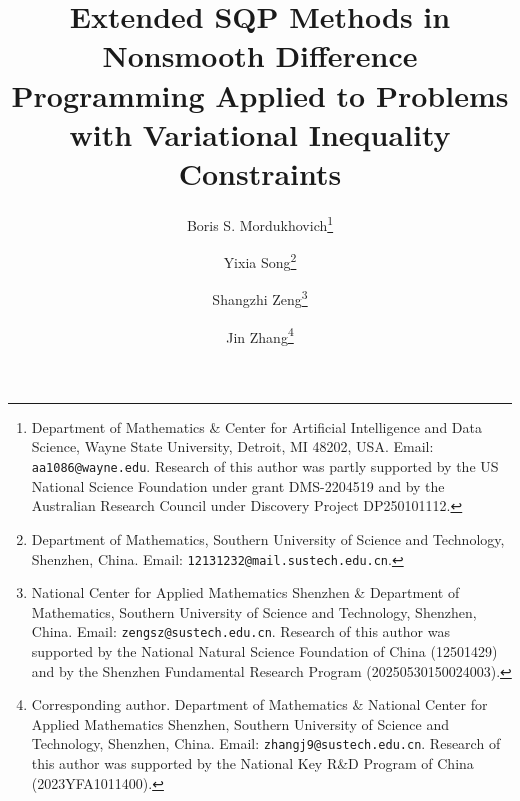 \documentclass[11pt,a4paper]{article}
\theoremstyle{plain}
\begin{document}
\title{Extended SQP Methods in Nonsmooth Difference Programming  Applied to Problems with Variational Inequality Constraints}

\author{
  Boris S. Mordukhovich\thanks{Department of Mathematics \& Center for Artificial Intelligence and Data Science, Wayne State University, Detroit, MI 48202, USA. Email: \texttt{aa1086@wayne.edu}. Research of this author was partly supported by the US National Science Foundation under grant DMS-2204519 and by the Australian Research Council under Discovery Project DP250101112.} 
  \and
  Yixia Song\thanks{Department of Mathematics, Southern University of Science and Technology, Shenzhen, China. Email: \texttt{12131232@mail.sustech.edu.cn}.}
  \and
  Shangzhi Zeng\thanks{National Center for Applied Mathematics Shenzhen \& Department of Mathematics, Southern University of Science and Technology, Shenzhen, China. Email: \texttt{zengsz@sustech.edu.cn}. Research of this author was supported by the National Natural Science Foundation of China (12501429) and by the Shenzhen Fundamental Research Program (20250530150024003).}
  \and
  Jin Zhang\thanks{Corresponding author. \quad Department of Mathematics \& National Center for Applied Mathematics Shenzhen, Southern University of Science and Technology, Shenzhen, China. Email: \texttt{zhangj9@sustech.edu.cn}. Research of this author was supported by the National Key R\&D Program of China (2023YFA1011400).}
}



\date{}


\maketitle
\end{document}
